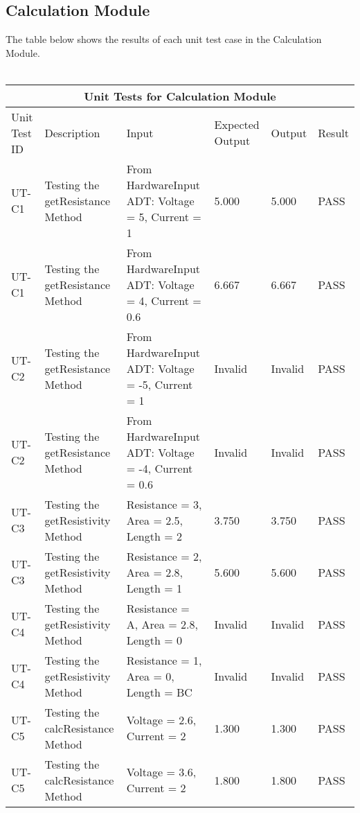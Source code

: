 \documentclass[12pt, titlepage]{article}
\begin{document}
\subsection{Calculation Module}
The table below shows the results of each unit test case in the Calculation Module.\\
\\
\begin{tabular}{ |p{1.5cm}||p{2.5cm}|p{3cm}|p{2cm}|p{2cm}|p{1.5cm}|}
  \hline
  \multicolumn{6}{|c|}{Unit Tests for Calculation Module} \\
  \hline
  Unit Test ID & Description & Input & Expected Output & Output & Result\\
  \hline
  UT-C1   & Testing the getResistance Method  &  From HardwareInput ADT: Voltage = 5, Current = 1 & 5.000 & 5.000 & PASS \\
  \hline
  UT-C1   & Testing the getResistance Method  &  From HardwareInput ADT: Voltage = 4, Current = 0.6 & 6.667 & 6.667 & PASS \\
  \hline
  UT-C2   & Testing the getResistance Method  &  From HardwareInput ADT: Voltage = -5, Current = 1 & Invalid & Invalid & PASS \\
  \hline
  UT-C2   & Testing the getResistance Method  &  From HardwareInput ADT: Voltage = -4, Current = 0.6 & Invalid & Invalid & PASS \\
  \hline
  UT-C3   & Testing the getResistivity Method  &  Resistance = 3, Area = 2.5, Length = 2 & 3.750 & 3.750 & PASS \\
  \hline
  UT-C3   & Testing the getResistivity Method  &  Resistance = 2, Area = 2.8, Length = 1 & 5.600 & 5.600 & PASS \\
  \hline
  UT-C4   & Testing the getResistivity Method  &  Resistance = A, Area = 2.8, Length = 0 & Invalid & Invalid & PASS \\
  \hline
  UT-C4   & Testing the getResistivity Method  &  Resistance = 1, Area = 0, Length = BC & Invalid & Invalid & PASS \\
  \hline
  UT-C5  & Testing the calcResistance Method  &  Voltage = 2.6, Current = 2 & 1.300 & 1.300 & PASS \\
  \hline
  UT-C5  & Testing the calcResistance Method  &  Voltage = 3.6, Current = 2 & 1.800 & 1.800 & PASS \\
  \hline
 \end{tabular}
\end{document}
